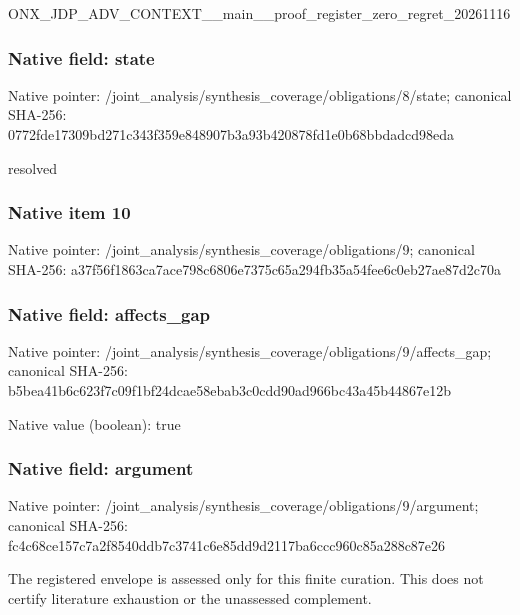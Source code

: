 \documentclass[10pt,a4paper]{article}
\begin{document}
\begingroup\raggedright\sloppy ONX\_\allowbreak{}JDP\_\allowbreak{}ADV\_\allowbreak{}CONTEXT\_\allowbreak{}\_\allowbreak{}main\_\allowbreak{}\_\allowbreak{}proof\_\allowbreak{}register\_\allowbreak{}zero\_\allowbreak{}regret\_\allowbreak{}20261116\par\endgroup

\subsubsection{Native field: state}
Native pointer: /joint\_\allowbreak{}analysis/synthesis\_\allowbreak{}coverage/obligations/8/state; canonical SHA-256: 0772fde17309bd271c343f359e848907b3a93b420878fd1e0b68bbdadcd98eda

\begingroup\raggedright\sloppy resolved\par\endgroup

\subsubsection{Native item 10}
Native pointer: /joint\_\allowbreak{}analysis/synthesis\_\allowbreak{}coverage/obligations/9; canonical SHA-256: a37f56f1863ca7ace798c6806e7375c65a294fb35a54fee6c0eb27ae87d2c70a

\subsubsection{Native field: affects\_\allowbreak{}gap}
Native pointer: /joint\_\allowbreak{}analysis/synthesis\_\allowbreak{}coverage/obligations/9/affects\_\allowbreak{}gap; canonical SHA-256: b5bea41b6c623f7c09f1bf24dcae58ebab3c0cdd90ad966bc43a45b44867e12b

Native value (boolean): true

\subsubsection{Native field: argument}
Native pointer: /joint\_\allowbreak{}analysis/synthesis\_\allowbreak{}coverage/obligations/9/argument; canonical SHA-256: fc4c68ce157c7a2f8540ddb7c3741c6e85dd9d2117ba6ccc960c85a288c87e26

\begingroup\raggedright\sloppy The registered envelope is assessed only for this finite curation. This does not certify literature exhaustion or the unassessed complement.\par\endgroup
\end{document}
